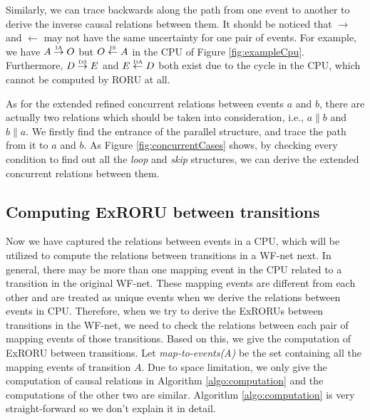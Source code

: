 \documentclass{llncs}
\begin{document}
Similarly, we can trace backwards along the path from one event to another to derive the inverse causal relations between them. It should be noticed that $\rightarrow$ and $\leftarrow$ may not have the same uncertainty for one pair of events. For example, we have $A\overset{\text{\tiny{IA}}}{\rightarrow}O$ but $O\overset{\text{\tiny{IS}}}{\leftarrow}A$ in the CPU of Figure \ref{fig:exampleCpu}. Furthermore, $D\overset{\text{\tiny{DS}}}{\rightarrow}E$ and $E\overset{\text{\tiny{DA}}}{\leftarrow}D$ both exist due to the cycle in the CPU, which cannot be computed by RORU \cite{jin2014computing} at all.

As for the extended refined concurrent relations between events $a$ and $b$, there are actually two relations which should be taken into consideration, i.e., $a\parallel b$ and $b\parallel a$. We firstly find the entrance of the parallel structure, and trace the path from it to $a$ and $b$. As Figure \ref{fig:concurrentCases} shows, by checking every condition to find out all the \textit{loop} and \textit{skip} structures, we can derive the extended concurrent relations between them.

\subsection{Computing ExRORU between transitions}
Now we have captured the relations between events in a CPU, which will be utilized to compute the relations between transitions in a WF-net next. In general, there may be more than one mapping event in the CPU related to a transition in the original WF-net. These mapping events are different from each other and are treated as unique events when we derive the relations between events in CPU. Therefore, when we try to derive the ExRORUs between transitions in the WF-net, we need to check the relations between each pair of mapping events of those transitions. Based on this, we give the computation of ExRORU between transitions. Let \textit{map-to-events(A)} be the set containing all the mapping events of transition $A$. Due to space limitation, we only give the computation of causal relations in Algorithm \ref{algo:computation} and the computations of the other two are similar. Algorithm \ref{algo:computation} is very straight-forward so we don't explain it in detail.
\end{document}
